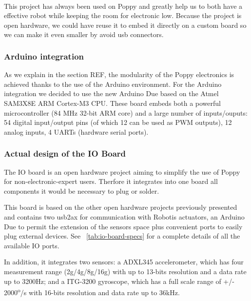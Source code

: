 \begin{figure}[tb]
\centering
    \hfil
    \\

    \caption{}
    \label{fig:usb2ax}
\end{figure}

This project has always been used on Poppy and greatly help us to both have a effective robot while keeping the room for electronic low.
Because the project is open hardware, we could have reuse it to embed it directly on a custom board so we can make it even smaller by avoid usb connectors.

\subsubsection{Arduino integration} %
As we explain in the section REF, the modularity of the Poppy electronics is achieved thanks to the use of the Arduino environment. For the Arduino integration we decided to use the new Arduino Due based on the Atmel SAM3X8E ARM Cortex-M3 CPU. These board embeds both a powerful microcontroller (84 MHz 32-bit ARM core) and a large number of inputs/ouputs: 54 digital input/output pins (of which 12 can be used as PWM outputs), 12 analog inputs, 4 UARTs (hardware serial ports).


\subsubsection{Actual design of the IO Board} %
The IO board is an open hardware project aiming to simplify the use of Poppy for non-electronic-expert users. Therfore it integrates into one board all components it would be necessary to plug or solder.


This board is based on the other open hardware projects previously presented and contains two usb2ax for communication with Robotis actuators, an Arduino Due to permit the extension of the sensors space plus convenient  ports to easily plug external devices. See \figurename~\ref{tab:io-board-specs} for a complete details of all the available IO ports.

In addition, it integrates two sensors: a ADXL345 accelerometer, which has four measurement range (2g/4g/8g/16g) with up to 13-bits resolution and a data rate up to 3200Hz; and a ITG-3200 gyroscope, which has a full scale range of +/- 2000\textsuperscript{o}/s with 16-bits resolution and data rate up to 36kHz.


